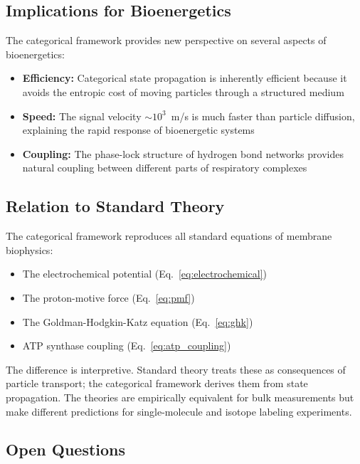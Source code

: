 \documentclass[twocolumn,showpacs,preprintnumbers,amsmath,amssymb,prd]{revtex4-2}
\begin{document}
\subsection{Implications for Bioenergetics}

The categorical framework provides new perspective on several aspects of bioenergetics:

\begin{itemize}
\item \textbf{Efficiency:} Categorical state propagation is inherently efficient because it avoids the entropic cost of moving particles through a structured medium

\item \textbf{Speed:} The signal velocity $\sim 10^3$~m/s is much faster than particle diffusion, explaining the rapid response of bioenergetic systems

\item \textbf{Coupling:} The phase-lock structure of hydrogen bond networks provides natural coupling between different parts of respiratory complexes
\end{itemize}

\subsection{Relation to Standard Theory}

The categorical framework reproduces all standard equations of membrane biophysics:
\begin{itemize}
\item The electrochemical potential (Eq.~\ref{eq:electrochemical})
\item The proton-motive force (Eq.~\ref{eq:pmf})
\item The Goldman-Hodgkin-Katz equation (Eq.~\ref{eq:ghk})
\item ATP synthase coupling (Eq.~\ref{eq:atp_coupling})
\end{itemize}

The difference is interpretive. Standard theory treats these as consequences of particle transport; the categorical framework derives them from state propagation. The theories are empirically equivalent for bulk measurements but make different predictions for single-molecule and isotope labeling experiments.

\subsection{Open Questions}
\end{document}
